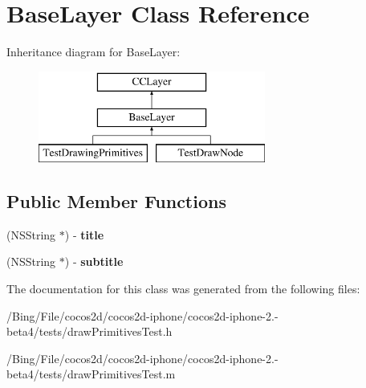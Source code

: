 \hypertarget{interface_base_layer}{\section{Base\-Layer Class Reference}
\label{interface_base_layer}
}
Inheritance diagram for Base\-Layer\-:\begin{figure}[H]
\begin{center}
\leavevmode
\includegraphics[height=3.000000cm]{interface_base_layer}
\end{center}
\end{figure}
\subsection*{Public Member Functions}
\begin{DoxyCompactItemize}
\item 
\hypertarget{interface_base_layer_a9baf4a958238028ac6ac88090cd0486c}{(N\-S\-String $\ast$) -\/ {\bfseries title}}\label{interface_base_layer_a9baf4a958238028ac6ac88090cd0486c}

\item 
\hypertarget{interface_base_layer_a7e3401ed2daa41210f58ef185bf66558}{(N\-S\-String $\ast$) -\/ {\bfseries subtitle}}\label{interface_base_layer_a7e3401ed2daa41210f58ef185bf66558}

\end{DoxyCompactItemize}


The documentation for this class was generated from the following files\-:\begin{DoxyCompactItemize}
\item 
/\-Bing/\-File/cocos2d/cocos2d-\/iphone/cocos2d-\/iphone-\/2.-\/beta4/tests/draw\-Primitives\-Test.\-h\item 
/\-Bing/\-File/cocos2d/cocos2d-\/iphone/cocos2d-\/iphone-\/2.-\/beta4/tests/draw\-Primitives\-Test.\-m\end{DoxyCompactItemize}
